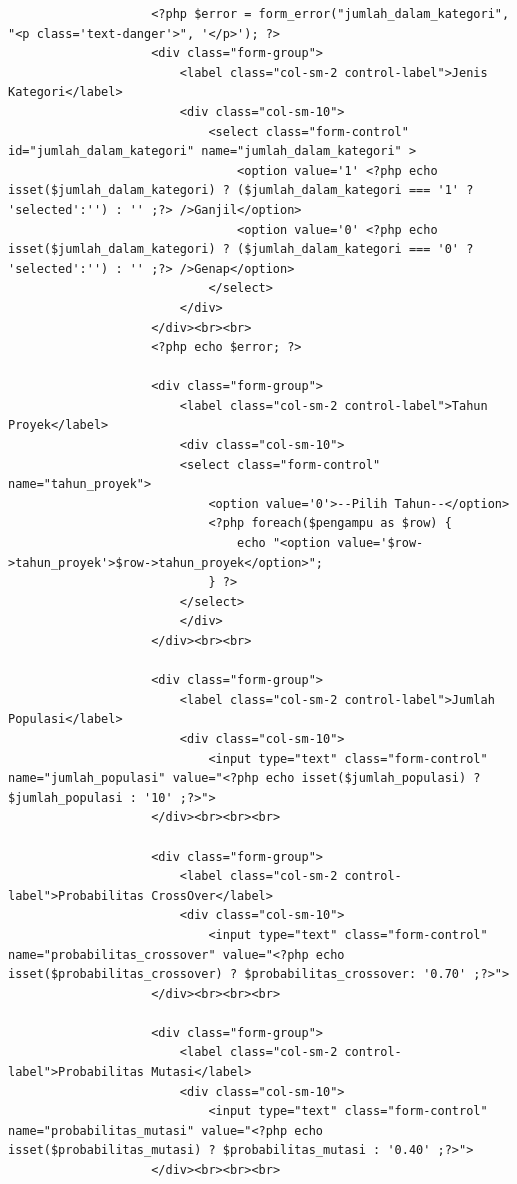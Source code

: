 \begin{enumerate}
\begin{enumerate}
\begin{lstlisting}
                    <?php $error = form_error("jumlah_dalam_kategori", "<p class='text-danger'>", '</p>'); ?>
                    <div class="form-group">
                        <label class="col-sm-2 control-label">Jenis Kategori</label>
                        <div class="col-sm-10">
                            <select class="form-control" id="jumlah_dalam_kategori" name="jumlah_dalam_kategori" >
                                <option value='1' <?php echo isset($jumlah_dalam_kategori) ? ($jumlah_dalam_kategori === '1' ? 'selected':'') : '' ;?> />Ganjil</option>
                                <option value='0' <?php echo isset($jumlah_dalam_kategori) ? ($jumlah_dalam_kategori === '0' ? 'selected':'') : '' ;?> />Genap</option>
                            </select>
                        </div>
                    </div><br><br>
                    <?php echo $error; ?>

                    <div class="form-group">
                        <label class="col-sm-2 control-label">Tahun Proyek</label>
                        <div class="col-sm-10"> 
                        <select class="form-control" name="tahun_proyek">
                            <option value='0'>--Pilih Tahun--</option>
                            <?php foreach($pengampu as $row) {
                                echo "<option value='$row->tahun_proyek'>$row->tahun_proyek</option>";
                            } ?>
                        </select>
                        </div>
                    </div><br><br>  
                    
                    <div class="form-group">
                        <label class="col-sm-2 control-label">Jumlah Populasi</label>
                        <div class="col-sm-10">
                            <input type="text" class="form-control" name="jumlah_populasi" value="<?php echo isset($jumlah_populasi) ? $jumlah_populasi : '10' ;?>">  
                    </div><br><br><br>   
                    
                    <div class="form-group">
                        <label class="col-sm-2 control-label">Probabilitas CrossOver</label>
                        <div class="col-sm-10">
                            <input type="text" class="form-control" name="probabilitas_crossover" value="<?php echo isset($probabilitas_crossover) ? $probabilitas_crossover: '0.70' ;?>">  
                    </div><br><br><br>  

                    <div class="form-group">
                        <label class="col-sm-2 control-label">Probabilitas Mutasi</label>
                        <div class="col-sm-10">
                            <input type="text" class="form-control" name="probabilitas_mutasi" value="<?php echo isset($probabilitas_mutasi) ? $probabilitas_mutasi : '0.40' ;?>"> 
                    </div><br><br><br>
                    

\end{lstlisting}
\end{enumerate}
\end{enumerate}
